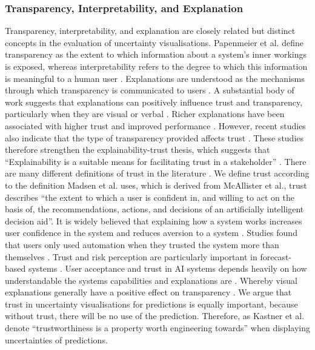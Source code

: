\documentclass[final,journal,a4paper]{IEEEtran}
\begin{document}
\subsubsection{Transparency, Interpretability, and Explanation}
Transparency, interpretability, and explanation are closely related but distinct concepts in the evaluation of uncertainty visualisations. Papenmeier et al. \cite{Papenmeier2022} define transparency as the extent to which information about a system’s inner workings is exposed, whereas interpretability refers to the degree to which this information is meaningful to a human user \cite{Papenmeier2022}. Explanations are understood as the mechanisms through which transparency is communicated to users \cite{Papenmeier2022}. A substantial body of work suggests that explanations can positively influence trust and transparency, particularly when they are visual or verbal \cite{Kizilcec2016, Dasgupta2017, Wang2016}. Richer explanations have been associated with higher trust and improved performance \cite{Yang2020, Zhang2020}. However, recent studies also indicate that the type of transparency provided affects trust \cite{Ghai2021, Zhang2020}. These studies therefore strengthen the explainability-trust thesis, which suggests that ``Explainability is a suitable means for facilitating trust in a stakeholder'' \cite{Sadeghi2024, Kastner2021}. There are many different definitions of trust in the literature \cite{Reyes2025, Watson2005, McKnight2001}. We define trust according to the definition Madsen et al. \cite{Madsen2000} uses, which is derived from McAllister et al., trust describes ``the extent to which a user is confident in, and willing to act on the basis of, the recommendations, actions, and decisions of an artificially intelligent decision aid''.
\newline
It is widely believed that explaining how a system works increases user confidence in the system \cite{Elofson2001, Glass2008, Pu2006, Wang2007} and reduces aversion to a system \cite{Dietvorst2015}. Studies found that users only used automation when they trusted the system more than themselves \cite{Muir1996, Barredo2020}. Trust and risk perception are particularly important in forecast-based systems \cite{Kenesei2025}. User acceptance and trust in AI systems depends heavily on how understandable the systems capabilities and explanations are \cite{Druce2021, Bahlmann2014}. Whereby visual explanations generally have a positive effect on transparency \cite{Ma2021}. We argue that trust in uncertainty visualisations for predictions is equally important, because without trust, there will be no use of the prediction. Therefore, as Kastner et al. \cite{Kastner2021} denote ``trustworthiness is a property worth engineering towards'' when displaying uncertainties of predictions.
\end{document}
